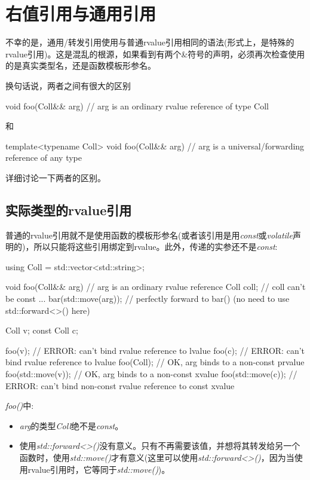 \section{右值引用与通用引用}
不幸的是，通用/转发引用使用与普通rvalue引用相同的语法(形式上，是特殊的rvalue引用)。这是混乱的根源，如果看到有两个\&符号的声明，必须再次检查使用的是真实类型名，还是函数模板形参名。

换句话说，两者之间有很大的区别

\begin{cppcode}
void foo(Coll&& arg) // arg is an ordinary rvalue reference of type Coll
\end{cppcode}

和

\begin{cppcode}
template<typename Coll>
void foo(Coll&& arg) // arg is a universal/forwarding reference of any type
\end{cppcode}

详细讨论一下两者的区别。

\subsection{实际类型的rvalue引用}

普通的rvalue引用就不是使用函数的模板形参名(或者该引用是用\textit{const}或\textit{volatile}声明的)，所以只能将这些引用绑定到rvalue。此外，传递的实参还不是\textit{const}:

\begin{cppcode}
using Coll = std::vector<std::string>;

void foo(Coll&& arg) // arg is an ordinary rvalue reference
{
	Coll coll; // coll can’t be const
	...
	bar(std::move(arg)); // perfectly forward to bar() (no need to use std::forward<>() here)
}

Coll v;
const Coll c;

foo(v); // ERROR: can’t bind rvalue reference to lvalue
foo(c); // ERROR: can’t bind rvalue reference to lvalue
foo(Coll{}); // OK, arg binds to a non-const prvalue
foo(std::move(v)); // OK, arg binds to a non-const xvalue
foo(std::move(c)); // ERROR: can’t bind non-const rvalue reference to const xvalue
\end{cppcode}

\textit{foo()}中:

\begin{itemize}
	\item \textit{arg}的类型\textit{Coll}绝不是\textit{const}。
	\item 使用\textit{std::forward<>()}没有意义。只有不再需要该值，并想将其转发给另一个函数时，使用\textit{std::move()}才有意义(这里可以使用\textit{std::forward<>()}，因为当使用rvalue引用时，它等同于\textit{std::move()})。
\end{itemize}


